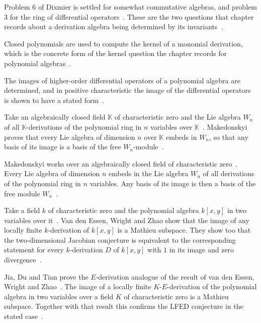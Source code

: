 Problem 6 of Dixmier is settled for somewhat commutative algebras, and
problem 3 for the ring of differential operators~\cite{WlDixmierSProblem6ForSomewhatCom2005}. These are the two questions
that chapter records about a derivation algebra being determined by its
invariants~\cite{WlDixmierSProblem6ForSomewhatCom2005}.

Closed polynomials are used to compute the kernel of a monomial derivation,
which is the concrete form of the kernel question the chapter records for
polynomial algebras~\cite{WlClosedPolynomialsAndTheirAppli2019}.

The images of higher-order differential operators of a polynomial algebra are
determined, and in positive characteristic the image of the differential
operators is shown to have a stated
form~\cite{WlImagesOfHigherOrderDifferentia2019}.

Take an algebraically closed field $\mathbb{K}$ of characteristic zero and the
Lie algebra $W_n$ of all $\mathbb{K}$-derivations of the polynomial ring in
$n$ variables over $\mathbb{K}$~\cite{WlOnNoncommutativeBasesOfFreeMod2015}. Makedonskyi proves that every Lie algebra of
dimension $n$ over $\mathbb{K}$ embeds in $W_n$, so that any basis of its image
is a basis of the free
$W_n$-module~\cite{WlOnNoncommutativeBasesOfFreeMod2015}.

Makedonskyi works over an algebraically closed field of characteristic
zero~\cite{WlOnNoncommutativeBasesOfFreeMod2015}. Every Lie algebra of dimension $n$ embeds in the Lie algebra $W_n$ of all
derivations of the polynomial ring in $n$ variables. Any
basis of its image is then a basis of the free module
$W_n$~\cite{WlOnNoncommutativeBasesOfFreeMod2015}.

Take a field $k$ of characteristic zero and the polynomial algebra $k[x,y]$
in two variables over it~\cite{WlImagesOfLocallyFiniteDerivatio2011}. Van den Essen, Wright and Zhao show that the image
of any locally finite
$k$-derivation of $k[x,y]$ is a Mathieu subspace. They show too that the %
two-dimensional Jacobian conjecture is equivalent to the corresponding
statement for every $k$-derivation $D$ of $k[x,y]$ with $1$ in its image and
zero divergence~\cite{WlImagesOfLocallyFiniteDerivatio2011}.

Jia, Du and Tian prove the $E$-derivation analogue of the result of van den
Essen, Wright and Zhao~\cite{WlImagesOfLocallyFiniteEDerivati2023}. The image of a locally finite $K$-$E$-derivation of
the polynomial algebra in two variables over a field $K$ of characteristic
zero is a Mathieu subspace. Together with that result this confirms the %
LFED conjecture in the stated
case~\cite{WlImagesOfLocallyFiniteEDerivati2023}.
